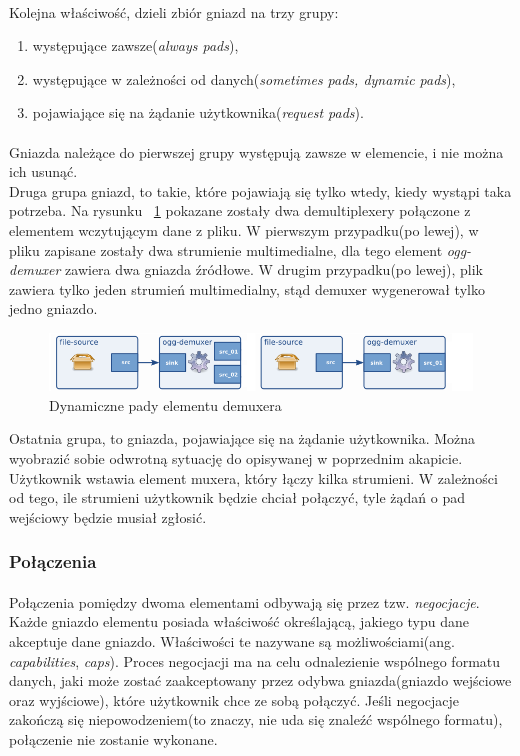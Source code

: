 \documentclass{article}
\begin{document}
\paragraph{}
Kolejna właściwość, dzieli zbiór gniazd na trzy grupy:
\begin{enumerate}
  \item występujące zawsze(\textit{always pads}),
  \item występujące w zależności od danych(\textit{sometimes pads, dynamic pads}),
  \item pojawiające się na żądanie użytkownika(\textit{request pads}).
\end{enumerate}
\paragraph{}
Gniazda należące do pierwszej grupy występują zawsze w elemencie, i nie można ich usunąć.\\
Druga grupa gniazd, to takie, które pojawiają się tylko wtedy, kiedy wystąpi taka potrzeba. Na rysunku ~\ref{fig:requestPadsDemux} pokazane zostały dwa demultiplexery połączone z elementem wczytującym dane z pliku. W pierwszym przypadku(po lewej), w pliku zapisane zostały dwa strumienie multimedialne, dla tego element \textit{ogg-demuxer} zawiera dwa gniazda źródłowe. W drugim przypadku(po lewej), plik zawiera tylko jeden strumień multimedialny, stąd demuxer wygenerował tylko jedno gniazdo.
\begin{figure}[H]
  \includegraphics[width=150mm]{img/request-pads-demux.png}
  \caption{Dynamiczne pady elementu demuxera}
  \label{fig:requestPadsDemux}
\end{figure}
Ostatnia grupa, to gniazda, pojawiające się na żądanie użytkownika. Można wyobrazić sobie odwrotną sytuację do opisywanej w poprzednim akapicie. Użytkownik wstawia element muxera, który łączy kilka strumieni. W zależności od tego, ile strumieni użytkownik będzie chciał połączyć, tyle żądań o pad wejściowy będzie musiał zgłosić.
\subsubsection{Połączenia}
\paragraph{}
Połączenia pomiędzy dwoma elementami odbywają się przez tzw. \textit{negocjacje}. Każde gniazdo elementu posiada właściwość określającą, jakiego typu dane akceptuje dane gniazdo. Właściwości te nazywane są możliwościami(ang. \textit{capabilities}, \textit{caps}). Proces negocjacji ma na celu odnalezienie wspólnego formatu danych, jaki może zostać zaakceptowany przez odybwa gniazda(gniazdo wejściowe oraz wyjściowe), które użytkownik chce ze sobą połączyć. Jeśli negocjacje zakończą się niepowodzeniem(to znaczy, nie uda się znaleźć wspólnego formatu), połączenie nie zostanie wykonane.
\end{document}
